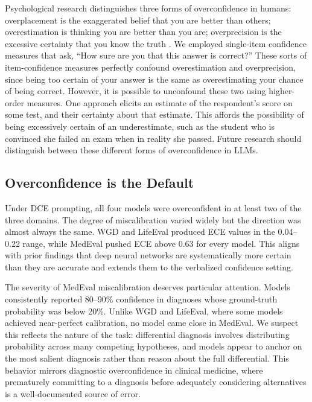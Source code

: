 \documentclass{article}
\begin{document}
Psychological research distinguishes three forms of overconfidence in humans: overplacement is the exaggerated belief that you are better than others; overestimation is thinking you are better than you are; overprecision is the excessive certainty that you know the truth \citep{Moore_Healy_2008}. We employed single-item confidence measures that ask, ``How sure are you that this answer is correct?'' These sorts of item-confidence measures perfectly confound overestimation and overprecision, since being too certain of your answer is the same as overestimating your chance of being correct. However, it is possible to unconfound these two using higher-order measures. One approach elicits an estimate of the respondent's score on some test, and their certainty about that estimate. This affords the possibility of being excessively certain of an underestimate, such as the student who is convinced she failed an exam when in reality she passed. Future research should distinguish between these different forms of overconfidence in LLMs. 


\subsection{Overconfidence is the Default}

Under DCE prompting, all four models were overconfident in at least two of the three domains. The degree of miscalibration varied widely but the direction was almost always the same. WGD and LifeEval produced ECE values in the 0.04--0.22 range, while MedEval pushed ECE above 0.63 for every model. This aligns with prior findings that deep neural networks are systematically more certain than they are accurate \citep{Oelrich_2020, Abdar_2021} and extends them to the verbalized confidence setting.

The severity of MedEval miscalibration deserves particular attention. Models consistently reported 80--90\% confidence in diagnoses whose ground-truth probability was below 20\%. Unlike WGD and LifeEval, where some models achieved near-perfect calibration, no model came close in MedEval. We suspect this reflects the nature of the task: differential diagnosis involves distributing probability across many competing hypotheses, and models appear to anchor on the most salient diagnosis rather than reason about the full differential. This behavior mirrors diagnostic overconfidence in clinical medicine, where prematurely committing to a diagnosis before adequately considering alternatives is a well-documented source of error.
\end{document}
